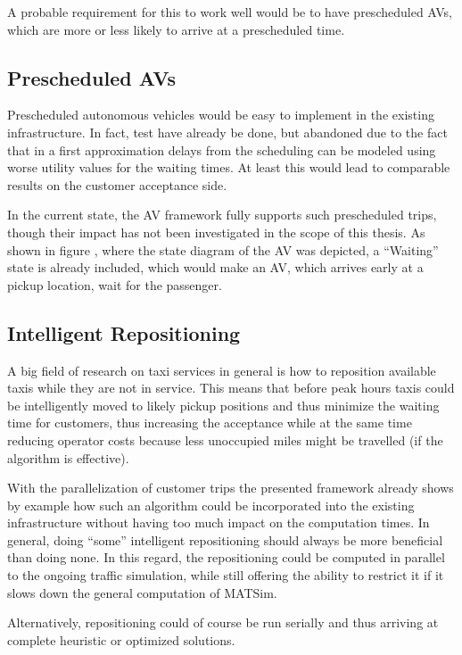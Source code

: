 A probable requirement for this to work well would be to have prescheduled AVs,
which are more or less likely to arrive at a prescheduled time.

\subsection{Prescheduled AVs}

Prescheduled autonomous vehicles would be easy to implement in the existing infrastructure.
In fact, test have already be done, but abandoned due to the fact that in a first
approximation delays from the scheduling can be modeled using worse utility values
for the waiting times. At least this would lead to comparable results on the customer
acceptance side.

In the current state, the AV framework fully supports such prescheduled trips, though
their impact has not been investigated in the scope of this thesis. As shown in
figure , where the state diagram of the AV was depicted, a ``Waiting''
state is already included, which would make an AV, which arrives early at a pickup
location, wait for the passenger.

\subsection{Intelligent Repositioning}

A big field of research on taxi services in general is how to reposition available
taxis while they are not in service. This means that before peak hours taxis could
be intelligently moved to likely pickup positions and thus minimize the waiting
time for customers, thus increasing the acceptance while at the same time reducing
operator costs because less unoccupied miles might be travelled (if the algorithm
is effective).

With the parallelization of customer trips the presented framework already shows
by example how such an algorithm could be incorporated into the existing infrastructure
without having too much impact on the computation times. In general, doing ``some''
intelligent repositioning should always be more beneficial than doing none. In
this regard, the repositioning could be computed in parallel to the ongoing
traffic simulation, while still offering the ability to restrict it if it slows
down the general computation of MATSim.

Alternatively, repositioning could of course be run serially and thus arriving
at complete heuristic or optimized solutions.

